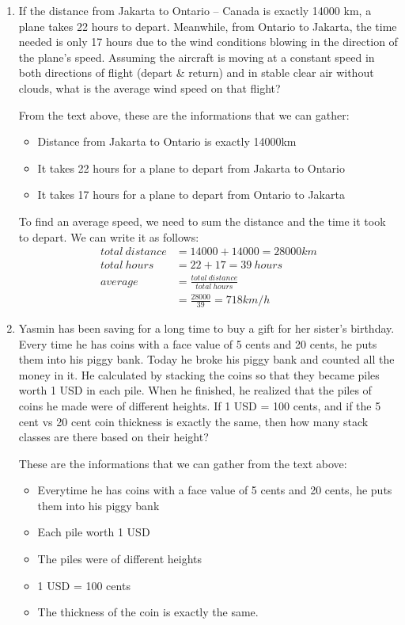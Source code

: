 \documentclass[12pt,titlepage]{article}
\begin{document}
\begin{enumerate}
    \item {
        If the distance from Jakarta to Ontario – Canada is exactly 14000 km, a plane takes 22 hours to depart.
        Meanwhile, from Ontario to Jakarta, the time needed is only 17 hours due to the wind conditions blowing in the
        direction of the plane's speed. Assuming the aircraft is moving at a constant speed in both directions of flight
        (depart \& return) and in stable clear air without clouds, what is the average wind speed on that flight?

        From the text above, these are the informations that we can gather:
        \begin{itemize}
            \item Distance from Jakarta to Ontario is exactly 14000km
            \item It takes 22 hours for a plane to depart from Jakarta to Ontario
            \item It takes 17 hours for a plane to depart from Ontario to Jakarta
        \end{itemize}

        To find an average speed, we need to sum the distance and the time it took to depart. We can write it as follows:
        \begin{align}
            total~distance &= 14000 + 14000 = 28000km\\
            total~hours    &= 22 + 17 = 39~hours\\
            average        &= \frac{total~distance}{total~hours}\\
                           &= \frac{28000}{39} = 718km/h
        \end{align}
    }
    \item {
        Yasmin has been saving for a long time to buy a gift for her sister's birthday. Every time he has coins with a
        face value of 5 cents and 20 cents, he puts them into his piggy bank. Today he broke his piggy bank and counted
        all the money in it. He calculated by stacking the coins so that they became piles worth 1 USD in each pile.
        When he finished, he realized that the piles of coins he made were of different heights. If 1 USD = 100
        cents, and if the 5 cent vs 20 cent coin thickness is exactly the same, then how many stack classes are there
        based on their height?

        These are the informations that we can gather from the text above:
        \begin{itemize}
            \item Everytime he has coins with a face value of 5 cents and 20 cents, he puts them into his piggy bank
            \item Each pile worth 1 USD
            \item The piles were of different heights
            \item 1 USD = 100 cents
            \item The thickness of the coin is exactly the same.
        \end{itemize}

}
\end{enumerate}
\end{document}
